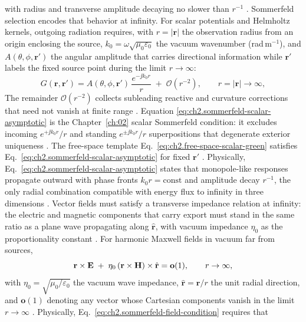 with radius and transverse amplitude decaying no slower than $r^{-1}$ \cite{jackson1999}.
Sommerfeld selection encodes that behavior at infinity. For scalar potentials and Helmholtz kernels,
outgoing radiation requires, with $r=|\mathbf{r}|$ the observation radius from an origin enclosing the source,
$k_0=\omega\sqrt{\mu_0\varepsilon_0}$ the vacuum wavenumber (rad\,m$^{-1}$), and
$A(\theta,\phi,\mathbf{r}')$ the angular amplitude that carries directional information while
$\mathbf{r}'$ labels the fixed source point during the limit $r\to\infty$:
\begin{equation}
\label{eq:ch2.sommerfeld-scalar-asymptotic}
G(\mathbf{r},\mathbf{r}')
=
A(\theta,\phi,\mathbf{r}')\,\frac{e^{-\jj k_0 r}}{r}
\;+\;
\mathcal{O}(r^{-2}),
\qquad
r=|\mathbf{r}|\to\infty,
\end{equation}
The remainder \(\mathcal{O}(r^{-2})\) collects subleading reactive and curvature corrections
that need not vanish at finite range \cite{stratton1941}. Equation
\eqref{eq:ch2.sommerfeld-scalar-asymptotic} is the Chapter~\ref{ch:02} scalar
Sommerfeld condition: it excludes incoming \(e^{+\jj k_0 r}/r\) and standing
\(e^{\pm\jj k_0 r}/r\) superpositions that degenerate exterior uniqueness
\cite{harrington2001}. The free-space template Eq.~\eqref{eq:ch2.free-space-scalar-green}
satisfies Eq.~\eqref{eq:ch2.sommerfeld-scalar-asymptotic} for fixed \(\mathbf{r}'\)
\cite{stratton1941}. Physically, Eq.~\eqref{eq:ch2.sommerfeld-scalar-asymptotic}
states that monopole-like responses propagate outward with phase fronts
\(k_0 r=\mathrm{const}\) and amplitude decay \(r^{-1}\), the only radial
combination compatible with energy flux to infinity in three dimensions
\cite{jackson1999}.
Vector fields must satisfy a transverse impedance relation at infinity: the electric and
magnetic components that carry export must stand in the same ratio as a plane wave
propagating along \(\hat{\mathbf{r}}\), with vacuum impedance \(\eta_0\) as the proportionality
constant \cite{stratton1941}. For harmonic Maxwell fields in vacuum far from sources,
\begin{equation}
\label{eq:ch2.sommerfeld-field-condition}
\mathbf{r}\times\mathbf{E}
\;+\;
\eta_0\,(\mathbf{r}\times\mathbf{H})\times\hat{\mathbf{r}}
=
\mathbf{o}(1),
\qquad
r\to\infty,
\end{equation}
with \(\eta_0=\sqrt{\mu_0/\varepsilon_0}\) the vacuum wave impedance,
\(\hat{\mathbf{r}}=\mathbf{r}/r\) the unit radial direction, and \(\mathbf{o}(1)\) denoting
any vector whose Cartesian components vanish in the limit \(r\to\infty\)
\cite{stratton1941}. Physically, Eq.~\eqref{eq:ch2.sommerfeld-field-condition} requires that
